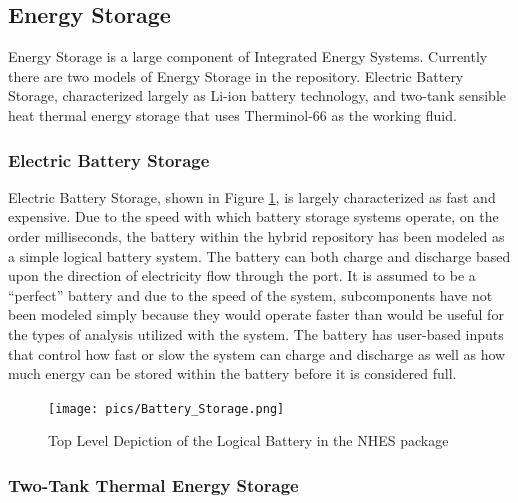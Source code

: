\subsection{Energy Storage}
Energy Storage is a large component of Integrated Energy Systems. Currently there are two models of Energy Storage in the repository. Electric Battery Storage, characterized largely as Li-ion battery technology, and two-tank sensible heat thermal energy storage that uses Therminol-66 as the working fluid. 


\subsubsection{Electric Battery Storage}

Electric Battery Storage, shown in Figure \ref{Top View Logical Battery}, is largely characterized as fast and expensive. Due to the speed with which battery storage systems operate, on the order milliseconds, the battery within the hybrid repository has been modeled as a simple logical battery system. The battery can both charge and discharge based upon the direction of electricity flow through the port. It is assumed to be a “perfect” battery and due to the speed of the system, subcomponents have not been modeled simply because they would operate faster than would be useful for the types of analysis utilized with the system. The battery has user-based inputs that control how fast or slow the system can charge and discharge as well as how much energy can be stored within the battery before it is considered full.   

\begin{figure}[hbtp]
\centering
\texttt{[image: pics/Battery\_Storage.png]}
\caption{Top Level Depiction of the Logical Battery in the NHES package}
\label{Top View Logical Battery}
\end{figure}


\subsubsection{Two-Tank Thermal Energy Storage}

